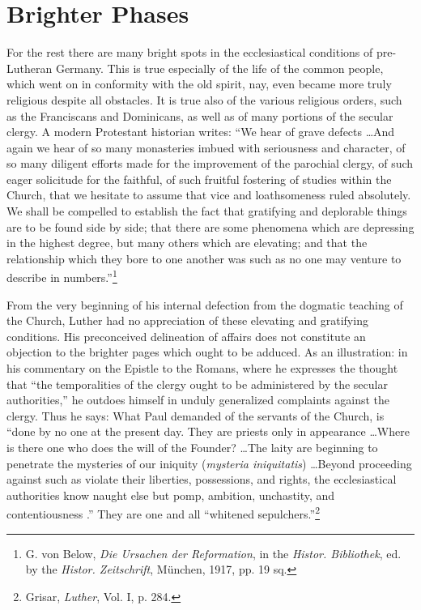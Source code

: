 \section{Brighter Phases}

For the rest there are many bright spots in the ecclesiastical conditions of pre-Lutheran Germany. This is true especially of the life
of the common people, which went on in conformity with the old
spirit, nay, even became more truly religious despite all obstacles. It
is true also of the various religious orders, such as the Franciscans and
Dominicans, as well as of many portions of the secular clergy. A
modern Protestant historian writes: “We hear of grave defects \dots And
again we hear of so many monasteries imbued with seriousness
and character, of so many diligent efforts made for the improvement of
the parochial clergy, of such eager solicitude for the faithful, of such
fruitful fostering of studies within the Church, that we
hesitate to assume that vice and loathsomeness ruled absolutely. We
shall be compelled to establish the fact that gratifying and deplorable
things are to be found side by side; that there are some phenomena
which are depressing in the highest degree, but many others which are
elevating; and that the relationship which they bore to one another
was such as no one may venture to describe in numbers.”\footnote
{G. von Below, \textit{Die Ursachen der Reformation}, in the \textit{Histor. Bibliothek}, ed. by the
\textit{Histor. Zeitschrift}, München, 1917, pp. 19 sq.}

From the very beginning of his internal defection from the dogmatic teaching
of the Church, Luther had no appreciation of these
elevating and gratifying conditions. His preconceived delineation of
affairs does not constitute an objection to the brighter pages which
ought to be adduced.
As an illustration: in his commentary on the Epistle to the Romans,
where he expresses the thought that “the temporalities of the clergy ought
to be administered by the secular authorities,” he outdoes himself in unduly
generalized complaints against the clergy. Thus he says: What Paul demanded
of the servants of the Church, is “done by no one at the present
day. They are priests only in appearance \dots Where is there one who
does the will of the Founder? \dots The laity are beginning to penetrate
the mysteries of our iniquity (\textit{mysteria iniquitatis}) \dots Beyond proceeding
against such as violate their liberties, possessions, and rights, the ecclesiastical
authorities know naught else but pomp, ambition, unchastity, and contentiousness
.” They are one and all “whitened sepulchers.”\footnote{Grisar, \textit{Luther}, Vol. I, p. 284.}

